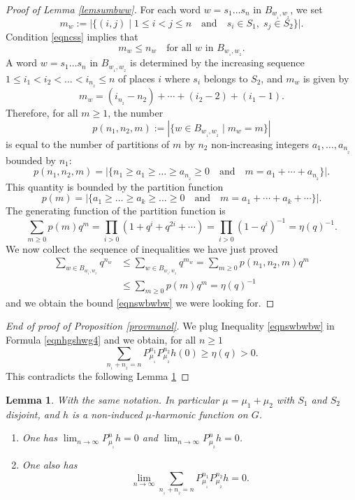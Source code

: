 \documentclass[JEP,XML,SOM,Unicode]{cedram}
\newenvironment{enumeratea}
{\bgroup\def\theenumi{\alph{enumi}}\begin{enumerate}}
{\end{enumerate}\egroup}
\newtheorem{Lem}[Thm]{Lemma}
\theoremstyle{definition}
\let\ra\to
\begin{document}
\begin{proof}[Proof of Lemma \ref{lemsumbww}]
For each word $w=s_1\ldots s_n$ in $B_{w_{_1}\!,w_{_2}}$, we set
\[
m_w:=\bigl|\{(i,j)\mid 1\leq i< j\leq n
\quad\text{and}\quad s_i\in S_1,\; s_j\in S_2\}\bigr|.
\]
Condition \eqref{eqncss} implies that
\[
m_w \leq n_w
\quad\text{for all $w$ in $B_{w_{_1}\!,w_{_2}}$}.
\]
A word $w=s_1\ldots s_n$ in $B_{w_{_1}\!,w_{_2}}$ is determined by the
increasing sequence $1\leq i_1<i_2<\ldots <i_{n_{_2}}\leq n$ of places $i$
where $s_i$ belongs to $S_2$, and $m_w$ is given by
\[
m_w=(i_{n_{_2}}\!-\!n_2)+\cdots +(i_2\!-\! 2)+(i_1\!-\! 1).
\]
Therefore, for all $m\geq 1$,
the number
\[
p(n_1,n_2,m):=|\{w \in B_{w_{_1},w_{_2}}\mid
m_w=m\}|
\]
is equal to the number of partitions of $m$
by $n_2$ non-increasing integers $a_1,\ldots,a_{n_{_2}}$ bounded by $n_1$:
\[
p(n_1,n_2,m)=\bigl|\{n_1\geq a_1\geq \ldots \geq a_{n_{_2}}\geq 0
\quad\text{and}\quad m=a_1+\cdots+a_{n_{_2}}\}\bigl|.
\]
This quantity is bounded by the partition function
\[
p(m)=\bigl|\{a_1\geq \ldots \geq a_k\geq \ldots\geq 0
\quad\text{and}\quad m=a_1+\cdots+a_k+\cdots\}\bigl|.
\]
The generating function of the partition function is
\[
\label{eqnspmqmp}
\sum_{m\geq 0}p(m)q^m
=
\prod\limits_{i> 0}(1+q^i+q^{2i}+\cdots)
= \prod\limits_{i> 0}(1-q^i)^{-1}
= \eta(q)^{-1}.
\]
We now collect the sequence of inequalities
we have just proved
\begin{align*}
\sum_{w\in B_{w_{_1}\!,w_{_2}}} q^{n_w}
&\leq
\sum_{w\in B_{w_{_1}\!,w_{_2}}} q^{m_w}
=
\sum_{m\geq 0} p(n_1,n_2,m)q^{m}\\
&\leq
\sum_{m\geq 0} p(m)q^{m}
=
\eta(q)^{-1}
\end{align*}
and we obtain the bound \eqref{eqnswbwbw} we were looking for.
\end{proof}

\begin{proof}[End of proof of Proposition \ref{provmunol}]
We plug Inequality \eqref{eqnswbwbw} in Formula \eqref{eqnhgshwg4}
and we obtain, for all $n\geq 1$
\begin{equation}
\label{eqnpmupmu}
\sum_{n_{_1}+n_{_2}=n}
P^{n_1}_{\mu_{_1}}P^{n_2}_{\mu_{_2}}h(0)\geq \eta(q)>0.
\end{equation}
This contradicts the following Lemma \ref{lempmupmu}
\end{proof}

\begin{Lem}\label{lempmupmu}
With the same notation. In particular $\mu=\mu_1+\mu_2$
with $S_1$ and $S_2$ disjoint,
and $h$ is a non-induced $\mu$-harmonic function on $G$.
\begin{enumeratea}
\item\label{lempmupmua}
One has
$\lim_{n\ra\infty}P^{n}_{\mu_{_1}}h =0$ and $\lim_{n\ra\infty}P^{n}_{\mu_{_2}}h = 0$.
\item\label{lempmupmub}
One also has
\begin{equation}
\label{eqnpmupmo}
\lim_{n\ra\infty}\sum_{n_{_1}+n_{_2}=n}
P^{n_1}_{\mu_{_1}}P^{n_2}_{\mu_{_2}}h=0.
\end{equation}
\end{enumeratea}
\end{Lem}
\end{document}
